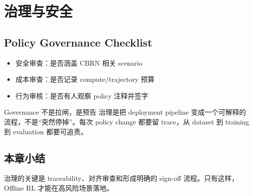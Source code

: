 \section{治理与安全}

\subsection{Policy Governance Checklist}

\begin{itemize}
    \item 安全审查：是否涵盖 CBRN 相关 scenario
    \item 成本审查：是否记录 compute/trajectory 预算
    \item 行为审核：是否有人观察 policy 注释并签字
\end{itemize}

\begin{knowledgebox}{Governance 不是拉闸，是预告}
治理是把 deployment pipeline 变成一个可解释的流程，不是“突然停掉”。每次 policy change 都要留 trace，从 dataset 到 training 到 evaluation 都要可追责。
\end{knowledgebox}

\subsection{本章小结}

治理的关键是 traceability、对齐审查和形成明确的 sign-off 流程。只有这样，Offline RL 才能在高风险场景落地。

